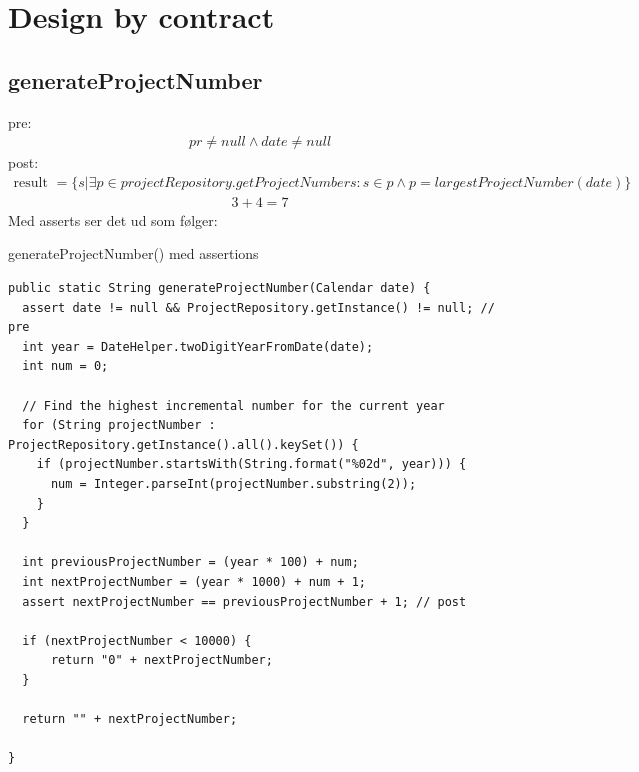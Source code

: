 \section{Design by contract}\label{chap:design_by_contract}

\subsection{generateProjectNumber} \label{sec:contract_generate_project_number}
pre: 
\begin{align}
    pr \neq null \land date \neq null
\end{align}
post:
\begin{align}
    \text{result } = \{s|\exists p \in projectRepository.getProjectNumbers : s \in p \land p = largestProjectNumber(date)\}
\end{align}
\begin{align}
    3 + 4 = 7
\end{align}
\newline
\noindent
Med asserts ser det ud som følger:

\begin{listing}[H]
    \centering
    \caption{generateProjectNumber() med assertions}\label{lst:cgenerate_project_number_assertions}
    \begin{verbatim}
public static String generateProjectNumber(Calendar date) {
  assert date != null && ProjectRepository.getInstance() != null; // pre
  int year = DateHelper.twoDigitYearFromDate(date);
  int num = 0;

  // Find the highest incremental number for the current year
  for (String projectNumber : ProjectRepository.getInstance().all().keySet()) {
    if (projectNumber.startsWith(String.format("%02d", year))) {
      num = Integer.parseInt(projectNumber.substring(2));
    }
  }

  int previousProjectNumber = (year * 100) + num;
  int nextProjectNumber = (year * 1000) + num + 1;
  assert nextProjectNumber == previousProjectNumber + 1; // post
  
  if (nextProjectNumber < 10000) {
      return "0" + nextProjectNumber;
  }

  return "" + nextProjectNumber;

}
    \end{verbatim}
\end{listing}

